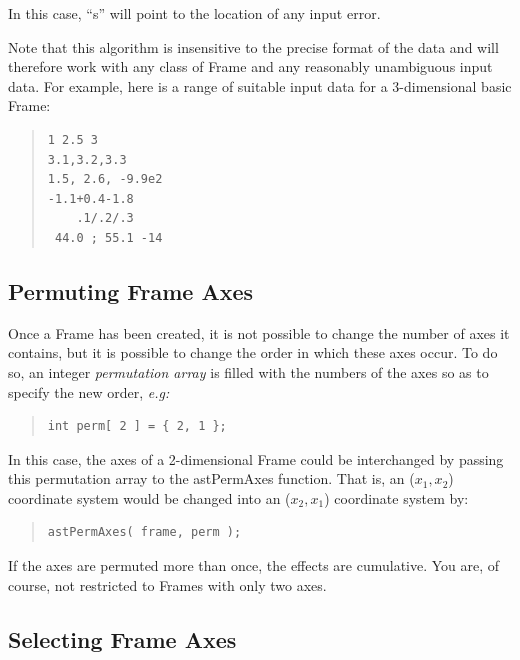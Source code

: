 \documentclass[twoside,11pt]{article}
\newcommand{\htmlref}[2]{#1}
\begin{document}
In this case, ``s'' will point to the location of any input error.

Note that this algorithm is insensitive to the precise format of the
data and will therefore work with any class of Frame and any
reasonably unambiguous input data. For example, here is a range of
suitable input data for a 3-dimensional basic Frame:

\begin{quote}
\small
\begin{verbatim}
1 2.5 3
3.1,3.2,3.3
1.5, 2.6, -9.9e2
-1.1+0.4-1.8
    .1/.2/.3
 44.0 ; 55.1 -14
\end{verbatim}
\normalsize
\end{quote}

\subsection{\label{ss:permutingaxes}Permuting Frame Axes}

Once a \htmlref{Frame}{Frame} has been created, it is not possible to change the number
of axes it contains, but it is possible to change the order in which
these axes occur. To do so, an integer {\em{permutation array}} is
filled with the numbers of the axes so as to specify the new order,
{\em{e.g:}}

\begin{quote}
\small
\begin{verbatim}
int perm[ 2 ] = { 2, 1 };
\end{verbatim}
\normalsize
\end{quote}

In this case, the axes of a 2-dimensional Frame could be interchanged
by passing this permutation array to the \htmlref{astPermAxes}{astPermAxes} function. That
is, an ($x_1,x_2$) coordinate system would be changed into an
($x_2,x_1$) coordinate system by:

\begin{quote}
\small
\begin{verbatim}
astPermAxes( frame, perm );
\end{verbatim}
\normalsize
\end{quote}

If the axes are permuted more than once, the effects are cumulative.
You are, of course, not restricted to Frames with only two axes.

\subsection{Selecting Frame Axes}
\end{document}
